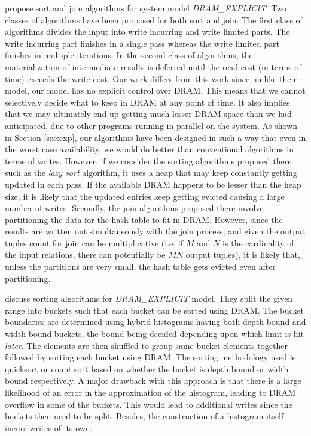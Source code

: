 \cite{viglas} propose sort and join algorithms for system model \textit{DRAM\_EXPLICIT}. Two classes of algorithms have been proposed for both sort and join. The first class of algorithms divides the input into write incurring and write limited parts. The write incurring part finishes in a single pass whereas the write limited part finishes in  multiple iterations. In the second class of algorithms, the materialization of intermediate results is deferred until the read cost (in terms of time) exceeds the write cost. Our work differs from this work since, unlike their model, our model has no explicit control over DRAM. This means that we cannot selectively decide what to keep in DRAM at any point of time. It also implies that we may ultimately end up getting much lesser DRAM space than we had anticipated, due to other programs running in parallel on the system. As shown in Section \ref{sec:exp}, our algorithms have been designed in such a way that even in the worst case availability, we would do better than conventional algorithms in terms of writes. However, if we consider the sorting algorithms proposed there such as the \textit{lazy sort} algorithm, it uses a heap that may keep constantly getting updated in each pass. If the available DRAM happens to be lesser than the heap size, it is likely that the updated entries keep getting evicted causing a large number of writes. Secondly, the join algorithms proposed there involve partitioning the data for the hash table to fit in DRAM. However, since the results are written out simultaneously with the join process, and given the output tuples count for join can be multiplicative (i.e. if $M$ and $N$ is the cardinality of the input relations, there can potentially be $MN$ output tuples), it is likely that, unless the partitions are very small, the hash table gets evicted even after partitioning. 

\cite{vamsi} discuss sorting algorithms for \textit{DRAM\_EXPLICIT} model. They split the given range into buckets such that each bucket can be sorted using DRAM. The bucket boundaries are determined using hybrid histograms having both depth bound and width bound buckets, the bound being decided depending upon which limit is hit \textit{later}. The elements are then shuffled to group same bucket elements together followed by sorting each bucket using DRAM. The sorting methodology used is quicksort or count sort based on whether the bucket is depth bound or width bound respectively. A major drawback with this approach is that there is a large likelihood of an error in the approximation of the histogram, leading to DRAM overflow in some of the buckets. This would lead to additional writes since the buckets then need to be split. Besides, the construction of a histogram itself incurs writes of its own.

